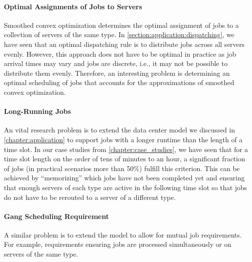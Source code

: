\paragraph{Optimal Assignments of Jobs to Servers} Smoothed convex optimization determines the optimal assignment of jobs to a collection of servers of the same type. In \cref{section:application:dispatching}, we have seen that an optimal dispatching rule is to distribute jobs across all servers evenly. However, this approach does not have to be optimal in practice as job arrival times may vary and jobs are discrete, i.e., it may not be possible to distribute them evenly. Therefore, an interesting problem is determining an optimal scheduling of jobs that accounts for the approximations of smoothed convex optimization.

\paragraph{Long-Running Jobs} An vital research problem is to extend the data center model we discussed in \cref{chapter:application} to support jobs with a longer runtime than the length of a time slot. In our case studies from \cref{chapter:case_studies}, we have seen that for a time slot length on the order of tens of minutes to an hour, a significant fraction of jobs (in practical scenarios more than 50\%) fulfill this criterion. This can be achieved by ``memorizing'' which jobs have not been completed yet and ensuring that enough servers of each type are active in the following time slot so that jobs do not have to be rerouted to a server of a different type.

\paragraph{Gang Scheduling Requirement} A similar problem is to extend the model to allow for mutual job requirements. For example, requirements ensuring jobs are processed simultaneously or on servers of the same type.
